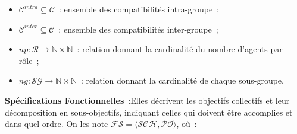 \begin{itemize}
\begin{itemize}
          \item $\mathcal{C}^{intra} \subseteq \mathcal{C}$~: ensemble des compatibilités intra-groupe~;
          \item $\mathcal{C}^{inter} \subseteq \mathcal{C}$~: ensemble des compatibilités inter-groupe~;
          \item $np: \mathcal{R} \rightarrow \mathbb{N} \times \mathbb{N}$~: relation donnant la cardinalité du nombre d'agents par rôle~;
          \item $ng: \mathcal{SG} \rightarrow \mathbb{N} \times \mathbb{N}$~: relation donnant la cardinalité de chaque sous-groupe.
        \end{itemize}
\end{itemize}

\medskip

\noindent \textbf{Spécifications Fonctionnelles}~:Elles décrivent les objectifs collectifs et leur décomposition en sous-objectifs, indiquant celles qui doivent être accomplies et dans quel ordre. On les note
\quad $\mathcal{FS} = \langle \mathcal{SCH}, \mathcal{PO} \rangle$, où~:

